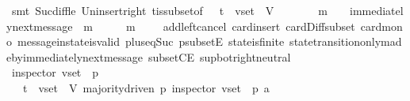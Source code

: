 \begin{isabellebody}
\ {\isacharparenleft}smt\ Suc{\isacharunderscore}diff{\isacharunderscore}le\ Un{\isacharunderscore}insert{\isacharunderscore}right\ {\isasymSigma}t{\isacharunderscore}is{\isacharunderscore}subset{\isacharunderscore}of{\isacharunderscore}{\isasymSigma}\ {\isacartoucheopen}{\isasymsigma}\ {\isasymin}\ {\isasymSigma}t\ {\isasymand}\ v{\isacharunderscore}set\ {\isasymsubseteq}\ V{\isacartoucheclose}\ {\isacartoucheopen}{\isasymsigma}\ {\isasymsubset}\ {\isasymsigma}{\isacharprime}{\isacartoucheclose}\ {\isacartoucheopen}{\isasymsigma}{\isacharprime}{\isacharprime}\ {\isasymin}\ {\isasymSigma}\ {\isasymand}\ m\ {\isasymin}\ {\isasymsigma}{\isacharprime}\ {\isasymand}\ immediately{\isacharunderscore}next{\isacharunderscore}message\ {\isacharparenleft}{\isasymsigma}{\isacharprime}{\isacharprime}{\isacharcomma}\ m{\isacharparenright}\ {\isasymand}\ {\isasymsigma}{\isacharprime}\ {\isacharequal}\ {\isasymsigma}{\isacharprime}{\isacharprime}\ {\isasymunion}\ {\isacharbraceleft}m{\isacharbraceright}\ {\isasymand}\ {\isasymsigma}\ {\isasymsubseteq}\ {\isasymsigma}{\isacharprime}{\isacharprime}{\isacartoucheclose}\ add{\isacharunderscore}left{\isacharunderscore}cancel\ card{\isachardot}insert\ card{\isacharunderscore}Diff{\isacharunderscore}subset\ card{\isacharunderscore}mono\ message{\isacharunderscore}in{\isacharunderscore}state{\isacharunderscore}is{\isacharunderscore}valid\ plus{\isacharunderscore}{}{\isacharunderscore}eq{\isacharunderscore}Suc\ psubsetE\ state{\isacharunderscore}is{\isacharunderscore}finite\ state{\isacharunderscore}transition{\isacharunderscore}only{\isacharunderscore}made{\isacharunderscore}by{\isacharunderscore}immediately{\isacharunderscore}next{\isacharunderscore}message\ subsetCE\ sup{\isacharunderscore}bot{\isachardot}right{\isacharunderscore}neutral{\isacharparenright}\ \ \ \ \ \ \isanewline
\ \ \ \ \ \isamarkupfalse%
\ \isamarkupfalse%
\ {\isachardoublequoteopen}inspector\ {\isacharparenleft}v{\isacharunderscore}set{\isacharcomma}\ {\isasymsigma}{\isacharprime}{\isacharprime}{\isacharcomma}\ p{\isacharparenright}{\isachardoublequoteclose}\isanewline
\ \ \ \ \ \ \ \isamarkupfalse%
\ {\isacartoucheopen}{\isasymsigma}\ {\isasymin}\ {\isasymSigma}t\ {\isasymand}\ v{\isacharunderscore}set\ {\isasymsubseteq}\ V{\isacartoucheclose}\ {\isacartoucheopen}majority{\isacharunderscore}driven\ p{\isacartoucheclose}\ {\isacartoucheopen}inspector\ {\isacharparenleft}v{\isacharunderscore}set{\isacharcomma}\ {\isasymsigma}{\isacharcomma}\ p{\isacharparenright}{\isacartoucheclose}\ a{}\isanewline

\end{isabellebody}
